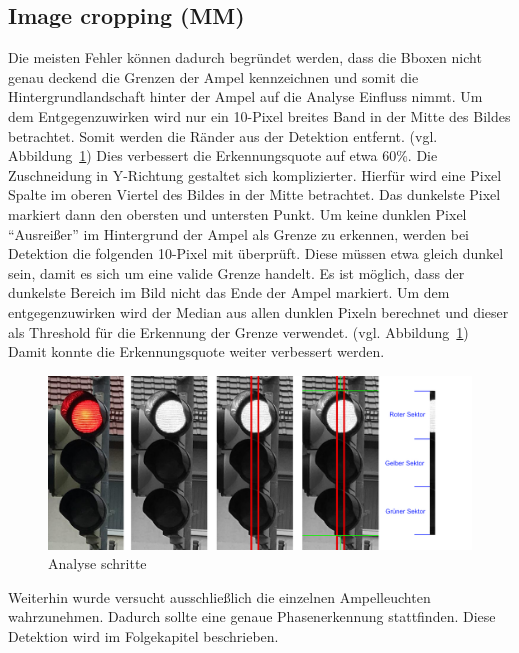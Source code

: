 \documentclass[a4paper,oneside,12pt]{report}
\begin{document}
\begin{onehalfspace}
		\section{Image cropping (MM)}
		Die meisten Fehler können dadurch begründet werden, dass die Bboxen nicht genau deckend die Grenzen der Ampel kennzeichnen und somit die Hintergrundlandschaft hinter der Ampel auf die Analyse Einfluss nimmt. Um dem Entgegenzuwirken wird nur ein 10-Pixel breites Band in der Mitte des Bildes betrachtet. Somit werden die Ränder aus der Detektion entfernt. (vgl. Abbildung~\ref{fig:TLCrop}) \newline
		Dies verbessert die Erkennungsquote auf etwa 60\%.\newline
		Die Zuschneidung in Y-Richtung gestaltet sich komplizierter. Hierfür wird eine Pixel Spalte im oberen Viertel des Bildes in der Mitte betrachtet. Das dunkelste Pixel markiert dann den obersten und untersten Punkt. Um keine dunklen Pixel "`Ausreißer"' im Hintergrund der Ampel als Grenze zu erkennen, werden bei Detektion die folgenden 10-Pixel mit überprüft. Diese müssen etwa gleich dunkel sein, damit es sich um eine valide Grenze handelt. Es ist möglich, dass der dunkelste Bereich im Bild nicht das Ende der Ampel markiert. Um dem entgegenzuwirken wird der Median aus allen dunklen Pixeln berechnet und dieser als Threshold für die Erkennung der Grenze verwendet. (vgl. Abbildung~\ref{fig:TLCrop}) Damit konnte die Erkennungsquote weiter verbessert werden.\newline
		\begin{figure}[h!]
			\includegraphics[width=\linewidth]{TLCropping.jpg}
			\caption{Analyse schritte}
			\label{fig:TLCrop}
		\end{figure}
		Weiterhin wurde versucht ausschließlich die einzelnen Ampelleuchten wahrzunehmen. Dadurch sollte eine genaue Phasenerkennung stattfinden. Diese Detektion wird im Folgekapitel beschrieben.

\end{onehalfspace}
\end{document}

